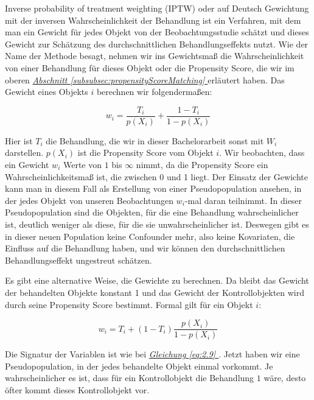 \documentclass[12pt,a4paper,twoside]{scrartcl}
\numberwithin{equation}{section}
\newcommand{\refsec}[1]{\emph{\hyperref[#1]{Abschnitt \ref*{#1} }}}
\renewcommand*{\refeq}[1]{\emph{\hyperref[#1]{Gleichung \ref*{#1} }}}
\begin{document}
Inverse probability of treatment weighting (IPTW) oder auf Deutsch Gewichtung mit der inversen Wahrscheinlichkeit der Behandlung ist ein Verfahren, mit dem man ein Gewicht für jedes Objekt von der Beobachtungsstudie schätzt und dieses Gewicht zur Schätzung des durchschnittlichen Behandlungseffekts nutzt. Wie der Name der Methode besagt, nehmen wir ins Gewichtsmaß die Wahrscheinlichkeit von einer Behandlung für dieses Objekt oder die Propensity Score, die wir im oberen \refsec{subsubsec:propensityScoreMatching} erläutert haben. Das Gewicht eines Objekts $i$ berechnen wir folgendermaßen: \par

\begin{equation}\label{eq:2.9}
  w_i = \frac{T_i}{p(X_i)} + \frac{1-T_i}{1-p(X_i)}
\end{equation}

\noindent
Hier ist $T_i$ die Behandlung, die wir in dieser Bachelorarbeit sonst mit $W_i$ darstellen. $p(X_i)$ ist die Propensity Score vom Objekt $i$. Wir beobachten, dass ein Gewicht $w_i$ Werte von $1$ bis $\infty$ nimmt, da die Propensity Score ein Wahrscheinlichkeitsmaß ist, die zwischen 0 und 1 liegt. Der Einsatz der Gewichte kann man in diesem Fall als Erstellung von einer Pseudopopulation ansehen, in der jedes Objekt von unseren Beobachtungen $w_i$-mal daran teilnimmt. In dieser Pseudopopulation sind die Objekten, für die eine Behandlung wahrscheinlicher ist, deutlich weniger als diese, für die sie unwahrscheinlicher ist. Deswegen gibt es in dieser neuen Population keine Confounder mehr, also keine Kovariaten, die Einfluss auf die Behandlung haben, und wir können den durchschnittlichen Behandlungseffekt ungestreut schätzen\cite{robins2000marginal}. 
\par 

\noindent
Es gibt eine alternative Weise, die Gewichte zu berechnen. Da bleibt das Gewicht der behandelten Objekte konstant 1 und das Gewicht der Kontrollobjekten wird durch seine Propensity Score bestimmt. Formal gilt für ein Objekt $i$:\par

\begin{equation}\label{eq:2.10}
  w_i = T_i + (1-T_i) \frac{p(X_i)}{1-p(X_i)}
\end{equation}

\noindent
Die Signatur der Variablen ist wie bei \refeq{eq:2.9}. Jetzt haben wir eine Pseudopopulation, in der jedes behandelte Objekt einmal vorkommt. Je wahrscheinlicher es ist, dass für ein Kontrollobjekt die Behandlung $1$ wäre, desto öfter kommt dieses Kontrollobjekt vor\cite{hirano2003efficient}.\par
\end{document}
